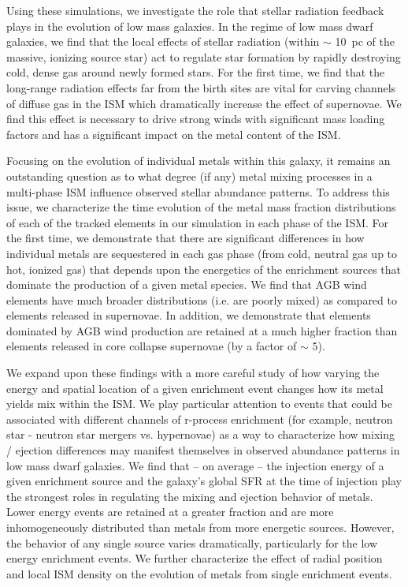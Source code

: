 Using these simulations, we investigate the role that stellar radiation feedback plays in the evolution of low mass galaxies.
In the regime of low mass dwarf galaxies, we find that the local effects of stellar radiation (within $\sim$ 10~pc of the massive, ionizing source star) act to regulate star formation by rapidly destroying cold, dense gas around newly formed stars. For the first time, we find that the long-range radiation effects far from the birth sites are vital for carving channels of diffuse gas in the ISM which dramatically increase the effect of supernovae. We find this effect is necessary to drive strong winds with significant mass loading factors and has a significant impact on the metal content of the ISM.

Focusing on the evolution of individual metals within this galaxy, it remains an outstanding question as to what degree (if any) metal mixing processes in a multi-phase ISM influence observed stellar abundance patterns. To address this issue, we characterize the time evolution of the metal mass fraction distributions of each of the tracked elements in our simulation in each phase of the ISM. For the first time, we demonstrate that there are significant differences in how individual metals are sequestered in each gas phase (from cold, neutral gas up to hot, ionized gas) that depends upon the energetics of the enrichment sources that dominate the production of a given metal species. We find that AGB wind elements have much broader distributions (i.e. are poorly mixed) as compared to elements released in supernovae. In addition, we demonstrate that elements dominated by AGB wind production are retained at a much higher fraction than elements released in core collapse supernovae (by a factor of $\sim$ 5).

We expand upon these findings with a more careful study of how varying the energy and spatial location of a given enrichment event changes how its metal yields mix within the ISM. We play particular attention to events that could be associated with different channels of r-process enrichment (for example, neutron star - neutron star mergers vs. hypernovae) as a way to characterize how mixing / ejection differences may manifest themselves in observed abundance patterns in low mass dwarf galaxies. We find that -- on average -- the injection energy of a given enrichment source and the galaxy's global SFR at the time of injection play the strongest roles in regulating the mixing and ejection behavior of metals. Lower energy events are retained at a greater fraction and are more inhomogeneously distributed than metals from more energetic sources. However, the behavior of any single source varies dramatically, particularly for the low energy enrichment events. We further characterize the
effect of radial position and local ISM density on the evolution of metals from single enrichment events. 


